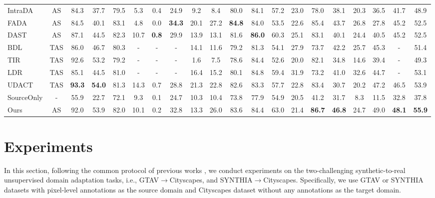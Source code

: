 \documentclass[sigconf]{acmart}
\begin{document}
\begin{table*}
\begin{tabular}{l | c | c c c c c c c c c c c c c c c  c | c | c}
    IntraDA \cite{pan2020unsupervised}&AS&	84.3&	37.7&	79.5&	5.3&	0.4&	24.9&	9.2&	8.4&	80.0&	84.1&	57.2&	23.0&	78.0&	38.1&	20.3&	36.5&	41.7&	48.9\\
    FADA \cite{wang2020classes}&AS&	84.5&	40.1&	83.1 &	4.8&	0.0 &	\textbf{34.3} &	20.1&	27.2&	\textbf{84.8} &	84.0&	53.5&	22.6&	85.4 &	43.7&	26.8&	27.8&	45.2&	52.5\\
    DAST \cite{yu2021dast} &AS&	87.1&	44.5&	82.3 &	10.7 &	\textbf{0.8}&	29.9&	13.9&	13.1&	81.6&	\textbf{86.0}&	60.3&	25.1&	83.1&	40.1&	24.4&	40.5&	45.2&	52.5\\
    \hline
    BDL \cite{li2019bidirectional} & TAS& 86.0&  46.7 & 80.3 & -&  -&  -&  14.1&  11.6&  79.2&  81.3&  54.1&  27.9&  73.7&  42.2&  25.7&  45.3 &- &  51.4\\
    TIR \cite{yang2020fda}&TAS&92.6& 53.2& 79.2& -&-&-&1.6& 7.5& 78.6& 84.4& 52.6& 20.0& 82.1& 34.8& 14.6& 39.4& - & 49.3 \\
    LDR \cite{yang2020label}&TAS &85.1& 44.5& 81.0& - & - & - &16.4 &15.2 &80.1 &84.8 &59.4 &31.9& 73.2& 41.0& 32.6 &44.7&- & 53.1\\
    UDACT \cite{lee2020unsupervised} &TAS&	\textbf{93.3}&	\textbf{54.0}&	81.3&	14.3&	0.7&	28.8&	21.3&	22.8&	82.6&	83.3&	57.7&	22.8&	83.4&	30.7&	20.2&	47.2&	46.5&	53.9\\
    \hline        
SourceOnly & - &	55.9&	22.7&	72.1&	9.3&	0.1&	24.7&	10.3&	10.4&	73.8&	77.9&	54.9&	20.5&	41.2&	31.7&	8.3&	11.5&	32.8&	37.8 \\
Ours &AS&	92.0&	53.9&	82.0&	10.1&	0.2&	32.8&	13.3&	26.0&	83.6&	84.4&	63.0&	21.4&	\textbf{86.7}&	\textbf{46.8}&	24.7&	49.0&	\textbf{48.1}&	\textbf{55.9}\\  
    \toprule
    \end{tabular}
    \label{tab:2}
\end{table*}

\section{Experiments}
\par In this section, following the common protocol of previous works \cite{hoffman2016fcns,luo2019taking,vu2019advent}, we conduct experiments on the two-challenging synthetic-to-real unsupervised domain adaptation tasks, i.e., GTAV$\rightarrow$Cityscapes, and SYNTHIA$\rightarrow$Cityscapes. Specifically, we use GTAV or SYNTHIA datasets with pixel-level annotations as the source domain and Cityscapes dataset without any annotations as the target domain.
\end{document}
